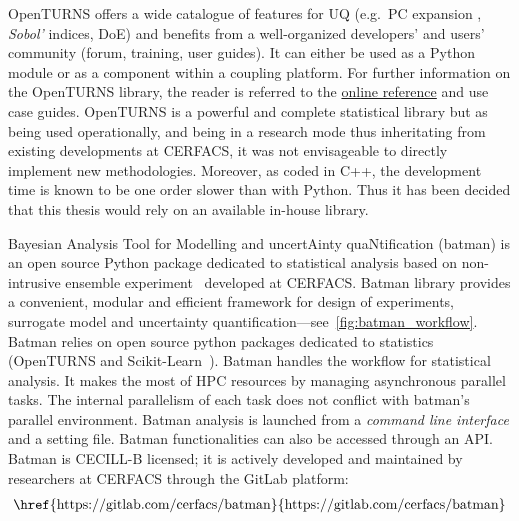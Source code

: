 OpenTURNS offers a wide catalogue of features for UQ (e.g.~PC expansion \cite{dutka2009}, \emph{Sobol'} indices, DoE) and benefits from a well-organized developers' and users' community (forum, training, user guides). It can either be used as a Python module or as a component within a coupling platform. For further information on the OpenTURNS library, the reader is referred to the \href{http://openturns.github.io/openturns/master/contents.html}{online reference} and use case guides. OpenTURNS is a powerful and complete statistical library but as being used operationally, and being in a research mode thus inheritating from existing developments at CERFACS, it was not envisageable to directly implement new methodologies. Moreover, as coded in C++, the development time is known to be one order slower than with Python. Thus it has been decided that this thesis would rely on an available in-house library.

Bayesian Analysis Tool for Modelling and uncertAinty quaNtification (batman) is an open source Python package dedicated to statistical analysis based on non-intrusive ensemble experiment~\cite{Roy2018b} developed at CERFACS. Batman library provides a convenient, modular and efficient framework for design of experiments, surrogate model and uncertainty quantification---see~\cref{fig:batman_workflow}. Batman relies on open source python packages dedicated to statistics (OpenTURNS and Scikit-Learn~\citep{pedregosa2011}). Batman handles the workflow for statistical analysis. It makes the most of HPC resources by managing asynchronous parallel tasks. The internal parallelism of each task does not conflict with batman's parallel environment. Batman analysis is launched from a \emph{command line interface} and a setting file. Batman functionalities can also be accessed through an API. Batman is CECILL-B licensed; it is actively developed and maintained by researchers at CERFACS through the GitLab platform:
\begin{align}
\text{\href{https://gitlab.com/cerfacs/batman}{https://gitlab.com/cerfacs/batman}}	\nonumber
\end{align}

